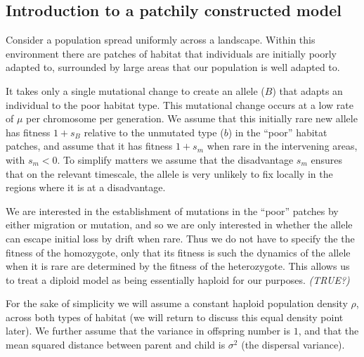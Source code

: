 \documentclass{article}
\newcommand{\gc}[1]{{ \it \color{green} (#1) } }
\begin{document}
\subsection{Introduction to a patchily constructed model}
\label{ss:patchyspace}

Consider a population spread uniformly across a landscape. Within this environment there are patches of
habitat that individuals are initially poorly adapted to, surrounded by large areas that our population is well adapted to. 

It takes only a single mutational change to create an allele ($B$) that adapts an individual to the
poor habitat type. This mutational change occurs at a low rate of
$\mu$ per chromosome per generation. We assume that this initially rare new
allele has fitness $1+s_B$ relative to the unmutated type ($b$) in the ``poor'' habitat patches,
and assume that it has fitness $1+s_m$ when rare in the intervening areas, with
$s_m<0$. To simplify matters we assume that the disadvantage $s_m$ ensures that on the relevant timescale,
the allele is very unlikely to fix locally in the regions where it is at a disadvantage.

We are interested in the establishment of mutations in the ``poor'' patches by either
migration or mutation, and so we are only interested in whether the allele
can escape initial loss by drift when rare. Thus we do not have to
specify the the fitness of the homozygote, only that its
fitness is such the dynamics of the  allele when it is rare are
determined by the fitness of the heterozygote. This allows us to treat
a diploid model as being essentially haploid for our purposes. \gc{TRUE?}

For the sake of simplicity we will assume a constant haploid population density $\rho$, 
across both types of habitat (we will return to discuss this equal
density point later). We further assume that the
variance in offspring number is $1$, and that the mean squared distance between parent and child is $\sigma^2$ (the dispersal variance).
\end{document}
